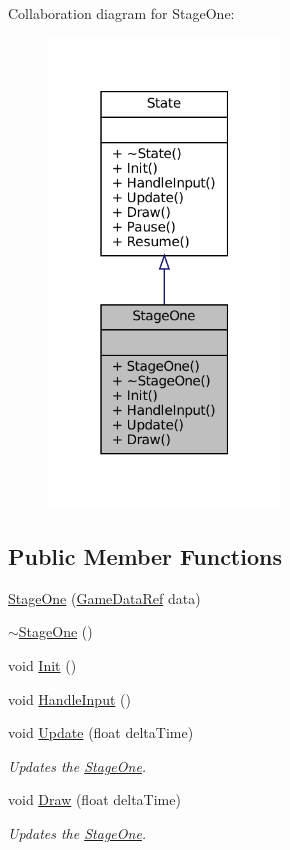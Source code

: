 Collaboration diagram for Stage\+One\+:\nopagebreak
\begin{figure}[H]
\begin{center}
\leavevmode
\includegraphics[width=175pt]{classStageOne__coll__graph}
\end{center}
\end{figure}
\subsection*{Public Member Functions}
\begin{DoxyCompactItemize}
\item 
\mbox{\hyperlink{classStageOne_a9eb31d0ce98795803b764b8836493008}{Stage\+One}} (\mbox{\hyperlink{Game_8h_aff850703a7797c8bfee2f02906aec50c}{Game\+Data\+Ref}} data)
\item 
\mbox{\hyperlink{classStageOne_a7761fca03288159de1772c59b31839d2}{$\sim$\+Stage\+One}} ()
\item 
void \mbox{\hyperlink{classStageOne_a661f4913ad0f6cc348c19bfa86c0c489}{Init}} ()
\item 
void \mbox{\hyperlink{classStageOne_a168fa7a88a44900ab5d91bfe87150221}{Handle\+Input}} ()
\item 
void \mbox{\hyperlink{classStageOne_aa26da852d0927aace63f7054fa097e2a}{Update}} (float delta\+Time)
\begin{DoxyCompactList}\small\item\em Updates the \mbox{\hyperlink{classStageOne}{Stage\+One}}. \end{DoxyCompactList}\item 
void \mbox{\hyperlink{classStageOne_af59dff5e563f4d1f45ea4b8708a3301e}{Draw}} (float delta\+Time)
\begin{DoxyCompactList}\small\item\em Updates the \mbox{\hyperlink{classStageOne}{Stage\+One}}. \end{DoxyCompactList}\end{DoxyCompactItemize}


